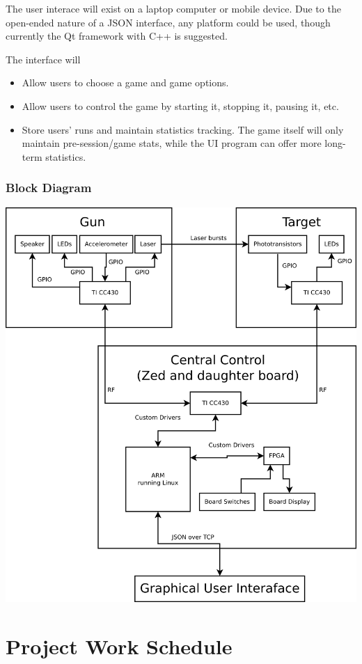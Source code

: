 \documentclass{article}
\begin{document}
The user interace will exist on a laptop computer or mobile device.
Due to the open-ended nature of a JSON interface, any platform could be used, though currently the Qt framework
with C++ is suggested.

The interface will
\begin{itemize}
\item Allow users to choose a game and game options.
\item Allow users to control the game by starting it, stopping it, pausing it, etc.
\item Store users' runs and maintain statistics tracking. The game itself will only maintain pre-session/game stats,
	while the UI program can offer more long-term statistics.
\end{itemize}

\subsubsection{Block Diagram}

\includegraphics[width=\textwidth, keepaspectratio]{block}

\section{Project Work Schedule}
\end{document}
